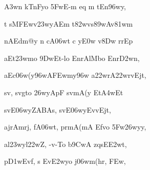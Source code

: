 {\dn {}\3A3w\?n kTnFyo \35FwE-m eq m\? tEn\396wy,{\dandadn}\dontdisplaylinenum }

{\dn {} t\? sM\3FEwv\323wyAEm t\382wvs\389wAv\381wm \vegdn\dontdisplaylinenum}



{\dn nAEdm@y\2 n cA\306wt\2 c y\3E0w v\?\38Dw\2 r\4rEp{\dandabdn} \dontdisplaylinenum}

{\dn aEt\323wmo \39DwEt-lo EnrAlMbo Enr\3D2wn, \vegdn\dontdisplaylinenum}

{\dn aEc\306w(y\396wA\3FEwm\?y\396w a\322wrA\322wrvEj\0t,{\dandabdn} \dontdisplaylinenum}

{\dn sv\0, sv\0gto \326wyApF sv\0mA(y Et\3A4wEt \vegdn\dontdisplaylinenum}

{\dn sv\?{\qvb}E\306wyZABAs, sv\?{\qvb}E\306wyEvvEj\0t,{\dandabdn} \dontdisplaylinenum}

{\dn ajrAmrj, fA\306wt, prmA(mA Efvo \35Fw\326wyy, \vegdn\dontdisplaylinenum}

{\dn al\323wyl\322wZ, -v-To b\5\39CwA zqs\2E\3E2wt,{\dandabdn} \dontdisplaylinenum}

{\dn p\3D1wEv\2f, s Ev\3E2w\?yo j\306wm(hr, \3FEw, \vegdn\dontdisplaylinenum}

